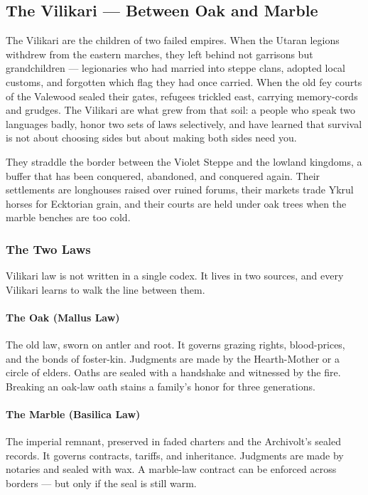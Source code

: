 \subsection*{The Vilikari --- Between Oak and Marble}

The Vilikari are the children of two failed empires. When the Utaran legions withdrew from the eastern marches, they left behind not garrisons but grandchildren --- legionaries who had married into steppe clans, adopted local customs, and forgotten which flag they had once carried. When the old fey courts of the Valewood sealed their gates, refugees trickled east, carrying memory-cords and grudges. The Vilikari are what grew from that soil: a people who speak two languages badly, honor two sets of laws selectively, and have learned that survival is not about choosing sides but about making both sides need you.

They straddle the border between the Violet Steppe and the lowland kingdoms, a buffer that has been conquered, abandoned, and conquered again. Their settlements are longhouses raised over ruined forums, their markets trade Ykrul horses for Ecktorian grain, and their courts are held under oak trees when the marble benches are too cold.

\subsubsection*{The Two Laws}

Vilikari law is not written in a single codex. It lives in two sources, and every Vilikari learns to walk the line between them.

\paragraph{The Oak (Mallus Law)}
The old law, sworn on antler and root. It governs grazing rights, blood-prices, and the bonds of foster-kin. Judgments are made by the Hearth-Mother or a circle of elders. Oaths are sealed with a handshake and witnessed by the fire. Breaking an oak-law oath stains a family's honor for three generations.

\paragraph{The Marble (Basilica Law)}
The imperial remnant, preserved in faded charters and the Archivolt's sealed records. It governs contracts, tariffs, and inheritance. Judgments are made by notaries and sealed with wax. A marble-law contract can be enforced across borders --- but only if the seal is still warm.

